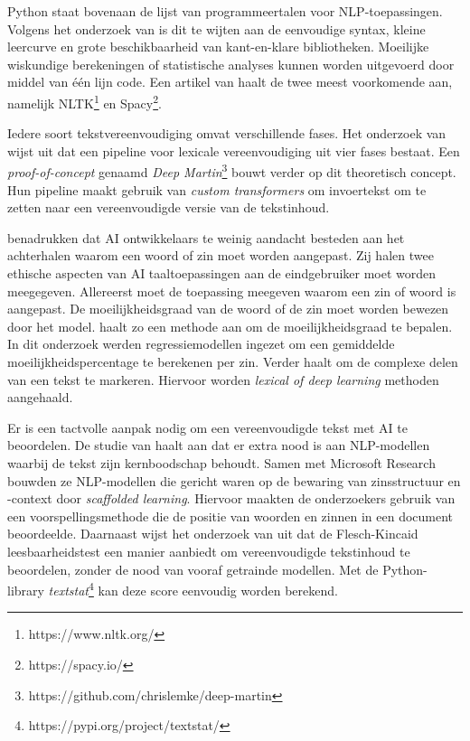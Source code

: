 Python staat bovenaan de lijst van programmeertalen voor NLP-toepassingen. Volgens het onderzoek van \textcite{Thangarajah2019} is dit te wijten aan de eenvoudige syntax, kleine leercurve en grote beschikbaarheid van kant-en-klare bibliotheken. Moeilijke wiskundige berekeningen of statistische analyses kunnen worden uitgevoerd door middel van één lijn code. Een artikel van \textcite{Malik2022} haalt de twee meest voorkomende aan, namelijk NLTK\footnote{https://www.nltk.org/} en Spacy\footnote{https://spacy.io/}.

Iedere soort tekstvereenvoudiging omvat verschillende fases. Het onderzoek van \textcite{Shardlow2014} wijst uit dat een pipeline voor lexicale vereenvoudiging uit vier fases bestaat. Een \textit{proof-of-concept} genaamd \textit{Deep Martin}\footnote{https://github.com/chrislemke/deep-martin} bouwt verder op dit theoretisch concept. Hun pipeline maakt gebruik van \textit{custom transformers} om invoertekst om te zetten naar een vereenvoudigde versie van de tekstinhoud.

\textcite{Garbacea2021} benadrukken dat AI ontwikkelaars te weinig aandacht besteden aan het achterhalen waarom een woord of zin moet worden aangepast. Zij halen twee ethische aspecten van AI taaltoepassingen aan de eindgebruiker moet worden meegegeven. Allereerst moet de toepassing meegeven waarom een zin of woord is aangepast. De moeilijkheidsgraad van de woord of de zin moet worden bewezen door het model. \textcite{Iavarone2021} haalt zo een methode aan om de moeilijkheidsgraad te bepalen. In dit onderzoek werden regressiemodellen ingezet om een gemiddelde moeilijkheidspercentage te berekenen per zin. Verder haalt \textcite{Garbacea2021} om de complexe delen van een tekst te markeren. Hiervoor worden \textit{lexical of deep learning} methoden aangehaald.

Er is een tactvolle aanpak nodig om een vereenvoudigde tekst met AI te beoordelen. De studie van \textcite{Swayamdipta2019} haalt aan dat er extra nood is aan NLP-modellen waarbij de tekst zijn kernboodschap behoudt. Samen met Microsoft Research bouwden ze NLP-modellen die gericht waren op de bewaring van zinsstructuur en -context door \emph{scaffolded learning}. Hiervoor maakten de onderzoekers gebruik van een voorspellingsmethode die de positie van woorden en zinnen in een document beoordeelde. Daarnaast wijst het onderzoek van \textcite{Readable2021} uit dat de Flesch-Kincaid leesbaarheidstest een manier aanbiedt om vereenvoudigde tekstinhoud te beoordelen, zonder de nood van vooraf getrainde modellen. Met de Python-library \textit{textstat}\footnote{https://pypi.org/project/textstat/} kan deze score eenvoudig worden berekend.


